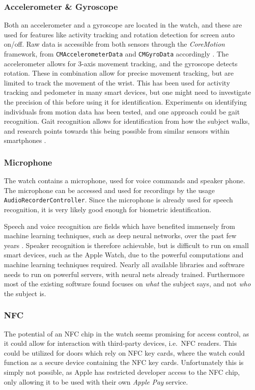 \subsubsection{Accelerometer \& Gyroscope}
Both an accelerometer and a gyroscope are located in the watch, and these are
used for features like activity tracking and rotation detection for screen
auto on/off. Raw data is accessible from both sensors through the
\textit{CoreMotion} framework, from \texttt{CMAccelerometerData} and
\texttt{CMGyroData} accordingly \cite{coremotionfw}. The accelerometer allows
for 3-axis movement tracking, and the gyroscope detects rotation. These in
combination allow for precise movement tracking, but are limited to track the
movement of the wrist. This has been used for activity tracking and pedometer 
in many smart devices, but one might need to investigate the precision of this
before using it for identification. 
Experiments on identifying individuals from motion data has been tested, and
one approach could be gait recognition. Gait recognition allows for
identification from how the subject walks, and research points towards this
being possible from similar sensors within smartphones \cite{7181946}. 

\subsubsection{Microphone}
The watch contains a microphone, used for voice commands and speaker phone. The
microphone can be accessed and used for recordings by the usage
\texttt{AudioRecorderController}. Since the microphone is already used for
speech recognition, it is very likely good enough for biometric identification. 

Speech and voice recognition are fields which have benefited immensely from 
machine learning techniques, such as deep neural networks, over the past few 
years \cite{6296526}. Speaker recognition is therefore achievable, but is 
difficult to run on small smart devices, such as the Apple Watch, due to the 
powerful computations and machine learning techniques required. Nearly all 
available libraries and software needs to run on powerful servers, with neural
nets already trained. 
Furthermore most of the existing software found focuses on \textit{what} the 
subject says, and not \textit{who} the subject is.

\subsubsection{NFC}
The potential of an NFC chip in the watch seems promising for access control, as
it could allow for interaction with third-party devices, i.e.\ NFC readers. This
could be utilized for doors which rely on NFC key cards, where the watch could
function as a secure device containing the NFC key cards. 
Unfortunately this is simply not possible, as Apple has restricted developer 
access to the NFC chip, only allowing it to be used with their own \textit{Apple
    Pay} service. 

